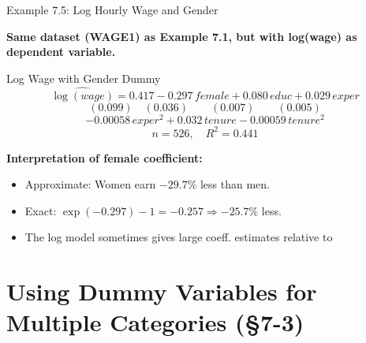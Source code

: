 \documentclass[aspectratio=169, 12pt]{beamer}
\begin{document}
\begin{frame}[shrink=25]{Example 7.5: Log Hourly Wage and Gender}

  \textbf{Same dataset (WAGE1) as Example 7.1, but with log(wage) as dependent variable.}

  \medskip

  \begin{examplebox}{Log Wage with Gender Dummy}
    \[
      \widehat{\log(\textit{wage})} = 0.417 - 0.297 \, \textit{female} + 0.080 \, \textit{educ} + 0.029 \, \textit{exper}
    \]
    \[
      (0.099) \quad (0.036) \quad\quad (0.007) \quad\quad (0.005)
    \]
    \[
      - 0.00058 \, \textit{exper}^2 + 0.032 \, \textit{tenure} - 0.00059 \, \textit{tenure}^2
    \]
    \[
      n = 526, \quad R^2 = 0.441
    \]
  \end{examplebox}

  \medskip

  \textbf{Interpretation of female coefficient:}

  \begin{keybox}
    \begin{itemize}
      \item Approximate: Women earn $-29.7\%$ less than men.
      \item Exact: $\exp(-0.297) - 1 = -0.257 \Rightarrow -25.7\%$ less.
      \item The log model sometimes gives large coeff. estimates relative to %
    \end{itemize}
  \end{keybox}

\end{frame}

\section{Using Dummy Variables for Multiple Categories (\S7-3)}
\end{document}
